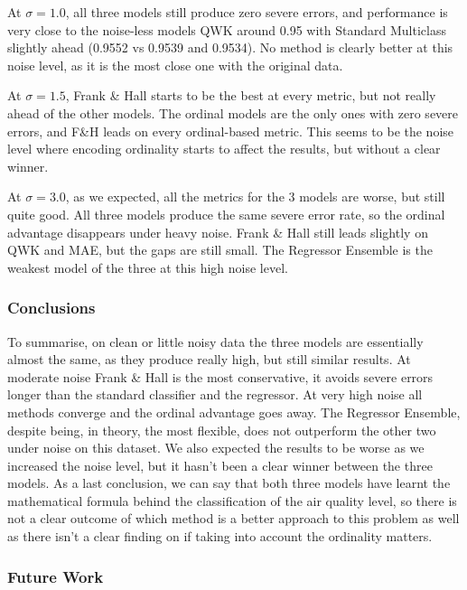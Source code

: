 \documentclass[a4paper,12pt]{article}
\begin{document}
	At $\sigma = 1.0$, all three models still produce zero severe errors, and performance is very close to the noise-less models QWK around 0.95 with Standard Multiclass slightly ahead (0.9552 vs 0.9539 and 0.9534). No method is clearly better at this noise level, as it is the most close one with the original data.
	
	At $\sigma = 1.5$, Frank \& Hall starts to be the best at every metric, but not really ahead of the other models. The ordinal models are the only ones with zero severe errors, and F\&H leads on every ordinal-based metric. This seems to be the noise level where encoding ordinality starts to affect the results, but without a clear winner.
	
	At $\sigma = 3.0$, as we expected, all the metrics for the 3 models are worse, but still quite good. All three models produce the same severe error rate, so the ordinal advantage disappears under heavy noise. Frank \& Hall still leads slightly on QWK and MAE, but the gaps are still small. The Regressor Ensemble is the weakest model of the three at this high noise level.
	
	
	\subsubsection{Conclusions}
	
	To summarise, on clean or little noisy data the three models are essentially almost the same, as they produce really high, but still similar results. At moderate noise Frank \& Hall is the most conservative, it avoids severe errors longer than the standard classifier and the regressor. At very high noise all methods converge and the ordinal advantage goes away. The Regressor Ensemble, despite being, in theory, the most flexible, does not outperform the other two under noise on this dataset. 
	We also expected the results to be worse as we increased the noise level, but it hasn't been a clear winner between the three models. As a last conclusion, we can say that both three models have learnt the mathematical formula behind the classification of the air quality level, so there is not a clear outcome of which method is a better approach to this problem as well as there isn't a clear finding on if taking into account the ordinality matters.
	
	
	\subsubsection{Future Work}
	
\end{document}
